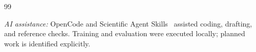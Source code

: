 \documentclass[11pt,a4paper]{article}
\begin{document}
\vspace{1pt}
\begingroup
\fontsize{8.4}{9.6}\selectfont
\setlength{\parskip}{0pt}
\begin{thebibliography}{99}
\setlength{\itemsep}{1.8pt}\setlength{\parsep}{0pt}

\end{thebibliography}
\endgroup
\vspace{-2pt}
{\fontsize{8}{9}\selectfont\textit{AI assistance:} OpenCode and Scientific Agent
Skills~\cite{Kassis2026scientific} assisted coding, drafting, and reference checks.
Training and evaluation were executed locally; planned work is identified explicitly.}
\end{document}
